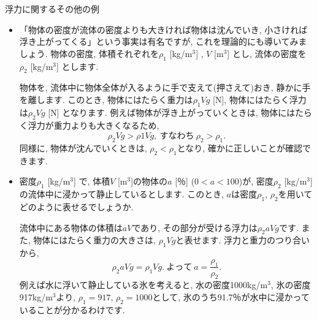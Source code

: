 \documentclass[11pt,dvipdfmx]{jsarticle}
\numberwithin{equation}{section} %
\begin{document}
\begin{exbox}{浮力に関するその他の例}
    \begin{itemize}
    \item 「物体の密度が流体の密度よりも大きければ物体は沈んでいき, 小さければ浮き上がってくる」という事実は有名ですが, これを理論的にも導いてみましょう. 物体の密度, 体積それぞれを$\rho_{1}$ [kg/m$^3$] , $V$ [m$^3$] とし, 流体の密度を$\rho_{2}$ [kg/m$^3$] とします.
        
    物体を, 流体中に物体全体が入るように手で支えて(押さえて)おき, 静かに手を離します. このとき, 物体にはたらく重力は$\rho_{1} Vg$ [N], 
    物体にはたらく浮力は$\rho_{2}Vg $ [N] となります. 例えば物体が浮き上がっていくときは, 物体にはたらく浮力が重力よりも大きくなるため, 
    \begin{equation}
        \rho_{2} Vg > \rho {1}Vg,\ すなわち\ \rho_{2} > \rho_{1}.
    \end{equation}
    同様に, 物体が沈んでいくときは, $\rho_{2} < \rho_{1}$となり, 確かに正しいことが確認できます.
    \item 密度$\rho_{1}$ [kg/m$^3$] で, 体積$V$ [m$^3$]の物体の$a$ [％] ($0 < a < 100$)が, 密度$\rho_{2}$ [kg/m$^3$]の流体中に浸かって静止しているとします. このとき, $a$は密度$\rho_{1}$, $\rho_{2}$を用いてどのように表せるでしょうか.
    
    流体中にある物体の体積は$aV$であり, その部分が受ける浮力は$\rho_{2}aVg$です. また, 物体にはたらく重力の大きさは, $\rho_{1}Vg$と表せます. 浮力と重力のつり合いから, 
    \begin{equation}
        \rho_{2}aVg = \rho_{1}Vg.\ よって\ a = \frac{\rho_{1}}{\rho_{2}}.
    \end{equation}
    例えば水に浮いて静止している氷を考えると, 水の密度1000kg/m$^3$, 氷の密度917kg/m$^3$より, $\rho_{1} = 917$, $\rho_{2} = 1000$として, 氷のうち91.7％が水中に浸かっていることが分かるわけです. 
\end{itemize}
\end{exbox}
\end{document}
